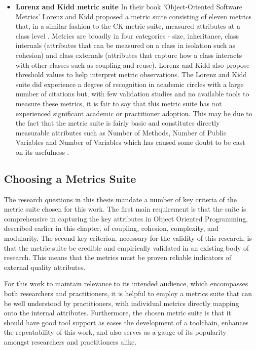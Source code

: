 \begin{itemize}
\item \textbf{Lorenz and Kidd metric suite} In their book 'Object-Oriented Software Metrics' Lorenz and Kidd proposed a metric suite consisting of eleven metrics that, in a similar fashion to the CK metric suite, measured attributes at a class level \citep{lorenz1994object}. Metrics are broadly in four categories - size, inheritance, class internals (attributes that can be measured on a class in isolation such as cohesion) and class externals (attributes that capture how a class interacts with other classes such as coupling and reuse). Lorenz and Kidd also propose threshold values to help interpret metric observations. The Lorenz and Kidd suite did experience a degree of recognition in academic circles with a large number of citations \citep{nesi1998effort} but, with few validation studies \citep{sharma2012metrics} and no available tools to measure these metrics, it is fair to say that this metric suite has not experienced significant academic or practitioner adoption. This may be due to the fact that the metric suite is fairly basic and constitutes directly measurable attributes such as Number of Methods, Number of Public Variables and Number of Variables which has caused some doubt to be cast on its usefulness \citep{harrison1998investigation}.
\end{itemize}

\subsection{Choosing a Metrics Suite} The research questions in this thesis mandate a number of key criteria of the metric suite chosen for this work. The first main requirement is that the suite is comprehensive in capturing the key attributes in Object Oriented Programming, described earlier in this chapter, of coupling, cohesion, complexity, and modularity. The second key criterion, necessary for the validity of this research, is that the metric suite be credible and empirically validated in an existing body of research. This means that the metrics must be proven reliable indicators of external quality attributes.

For this work to maintain relevance to its intended audience, which encompasses both researchers and practitioners, it is helpful to employ a metrics suite that can be well understood by practitioners, with individual metrics directly mapping onto the internal attributes. Furthermore, the chosen metric suite is that it should have good tool support as eases the development of a toolchain, enhances the repeatability of this work, and also serves as a gauge of its popularity amongst researchers and practitioners alike. 

